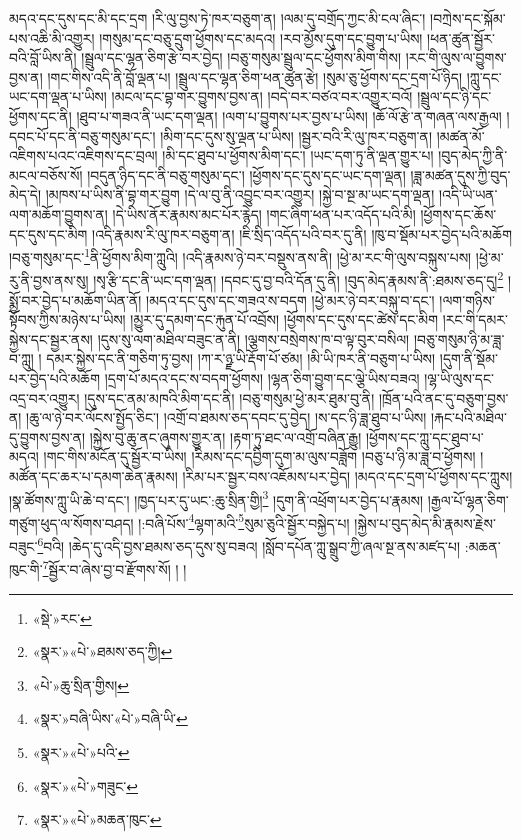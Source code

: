 མདའ་དང་དུས་དང་མི་དང་དྲག །རི་ལུ་བྱས་ཏེ་ཁར་བཅུག་ན། །ལམ་དུ་བགྲོད་ཀྱང་མི་ངལ་ཞིང་། །བཀྲེས་དང་སྐོམ་པས་འཆི་མི་འགྱུར། །གསུམ་དང་བཅུ་དྲུག་ཕྱོགས་དང་མདའ། །རབ་མྱོས་དུག་དང་བྱུག་པ་ཡིས། །ཕན་ཚུན་སྦྱོར་བའི་བློ་ཡིས་ནི། །སྦྲུལ་དང་ལྷན་ཅིག་རྩེ་བར་བྱེད། །བཅུ་གསུམ་སྦྲུལ་དང་ཕྱོགས་མིག་གིས། །རང་གི་ལུས་ལ་བྱུགས་བྱས་ན། །གང་གིས་འདི་ནི་བློ་ལྡན་པ། །སྦྲུལ་དང་ལྷན་ཅིག་ཕན་ཚུན་རྩེ། །སུམ་ཅུ་ཕྱོགས་དང་དྲག་པོ་ཉིད། །ཀླུ་དང་ཡང་དག་ལྡན་པ་ཡིས། །མངལ་དང་བྷ་གར་བྱུགས་བྱས་ན། །བདེ་བར་བཙའ་བར་འགྱུར་བའོ། །སྦྲུལ་དང་ཉི་དང་ཕྱོགས་དང་ནི། །ཐུབ་པ་གཟའ་ནི་ཡང་དག་ལྡན། །ལག་པ་བྱུགས་པར་བྱས་པ་ཡིས། །ཆོ་ལོ་རྩེ་ན་གཞན་ལས་རྒྱལ། །དབང་པོ་དང་ནི་བཅུ་གསུམ་དང་། །མིག་དང་དུས་སུ་ལྡན་པ་ཡིས། །སྦྱར་བའི་རི་ལུ་ཁར་བཅུག་ན། །མཚན་མོ་འཇིགས་པའང་འཇིགས་དང་བྲལ། །མི་དང་ཐུབ་པ་ཕྱོགས་མིག་དང་། །ཡང་དག་ཏུ་ནི་ལྡན་གྱུར་པ། །བུད་མེད་ཀྱི་ནི་མངལ་བཅོས་སོ། །བདུན་ཉིད་དང་ནི་བཅུ་གསུམ་དང་། །ཕྱོགས་དང་དུས་དང་ཡང་དག་ལྡན། །ཟླ་མཚན་དུས་ཀྱི་བུད་མེད་དེ། །མཁས་པ་ཡིས་ནི་བྷ་གར་བྱུག །དེ་ལ་བུ་ནི་འབྱུང་བར་འགྱུར། །སྐྱེ་བ་སྔ་མ་ཡང་དག་ལྡན། །འདི་ཡི་ཡན་ལག་མཆོག་བྱུགས་ན། །དེ་ཡིས་ནོར་རྣམས་མང་པོར་རྙེད། །གང་ཞིག་ཕན་པར་འདོད་པའི་མི། །ཕྱོགས་དང་ཆོས་དང་དུས་དང་མིག །འདི་རྣམས་རི་ལུ་ཁར་བཅུག་ན། །ཇི་སྲིད་འདོད་པའི་བར་དུ་ནི། །ཁུ་བ་སྡོམ་པར་བྱེད་པའི་མཆོག །བཅུ་གསུམ་དང་\footnote{«སྡེ་»རང་}ནི་ཕྱོགས་མིག་ཀླུའི། །འདི་རྣམས་ཉེ་བར་བསྡུས་ནས་ནི། །ཕྱེ་མ་རང་གི་ལུས་བསྐུས་པས། །ཕྱེ་མ་རུ་ནི་བྱས་ནས་སུ། །སྭ་རྩི་དང་ནི་ཡང་དག་ལྡན། །དབང་དུ་བྱ་བའི་དོན་དུ་ནི། །བུད་མེད་རྣམས་ནི་:ཐམས་ཅད་དུ།\footnote{«སྣར་»«པེ་»ཐམས་ཅད་ཀྱི།} །སྨྱོ་བར་བྱེད་པ་མཆོག་ཡིན་ནོ། །མདའ་དང་དུས་དང་གཟའ་ས་བདག །ཕྱེ་མར་ཉེ་བར་བསྐུ་བ་དང་། །ལག་གཉིས་སྟོབས་ཀྱིས་མཉེས་པ་ཡིས། །མྱུར་དུ་དམག་དང་རྐུན་པོ་འབྲོས། །ཕྱོགས་དང་དུས་དང་ཚེས་དང་མིག །རང་གི་དམར་སྐྱེས་དང་སྦྱར་ནས། །དུས་སུ་ལག་མཐིལ་བཟུང་ན་ནི། །ལྕགས་བསྲེགས་ཁ་བ་ལྟ་བུར་བསིལ། །བཅུ་གསུམ་ཉི་མ་ཟླ་བ་ཀླུ། །
དམར་སྐྱེས་དང་ནི་གཅིག་ཏུ་བྱས། །ཀ་ར་ཉྫ་ཡི་རྡོག་པོ་ཙམ། །མི་ཡི་ཁར་ནི་བཅུག་པ་ཡིས། །དུག་ནི་སྡོམ་པར་བྱེད་པའི་མཆོག །དྲག་པོ་མདའ་དང་ས་བདག་ཕྱོགས། །ལྷན་ཅིག་བྱུག་དང་ལྕེ་ཡིས་བཟའ། །ལྷ་ཡི་ལུས་དང་འདྲ་བར་འགྱུར། །དུས་དང་ནམ་མཁའི་མིག་དང་ནི། །བཅུ་གསུམ་ཕྱེ་མར་ཐུམ་བུ་ནི། །ཁྲོན་པའི་ནང་དུ་བཅུག་བྱས་ན། །ཆུ་ལ་ཉེ་བར་ལོངས་སྤྱོད་ཅིང་། །འགྲོ་བ་ཐམས་ཅད་དབང་དུ་བྱེད། །ས་དང་ཉི་ཟླ་ཐུབ་པ་ཡིས། །རྐང་པའི་མཐིལ་དུ་བྱུགས་བྱས་ན། །སྐྱེས་བུ་ཆུ་ནང་ཞུགས་གྱུར་ན། །རྟག་ཏུ་ཐང་ལ་འགྲོ་བཞིན་རྒྱུ། །ཕྱོགས་དང་ཀླུ་དང་ཐུབ་པ་མདའ། །གང་གིས་མངོན་དུ་སྦྱོར་བ་ཡིས། །རིམས་དང་དབྱིག་དུག་མ་ལུས་བཟློག །བཅུ་པ་ཉི་མ་ཟླ་བ་ཕྱོགས། །མཚོན་དང་ཆར་པ་དམག་ཆེན་རྣམས། །རིམ་པར་སྦྱར་བས་འཇོམས་པར་བྱེད། །མདའ་དང་དྲག་པོ་ཕྱོགས་དང་ཀླུས། །སྣ་ཚོགས་ཀླུ་ཡི་ཆེ་བ་དང་། །ཁྱད་པར་དུ་ཡང་:ཆུ་སྲིན་གྱི།\footnote{«པེ་»ཆུ་སྲིན་གྱིས།} །དུག་ནི་འཕྲོག་པར་བྱེད་པ་རྣམས། །རྒྱལ་པོ་ལྷན་ཅིག་གཙུག་ཕུད་ལ་སོགས་བཤད། །:བཞི་པོས་\footnote{«སྣར་»བཞི་ཡིས་«པེ་»བཞི་ཡི་}ལྷག་མའི་\footnote{«སྣར་»«པེ་»པའི་}སུམ་ཅུའི་སྦྱོར་བསྐྱེད་པ། །སྐྱེས་པ་བུད་མེད་མི་རྣམས་རྗེས་བཟུང་\footnote{«སྣར་»«པེ་»གཟུང་}བའི། །ཆེད་དུ་འདི་བྱས་ཐམས་ཅད་དུས་སུ་བཟའ། །སློབ་དཔོན་ཀླུ་སྒྲུབ་ཀྱི་ཞལ་སྔ་ནས་མཛད་པ། :མཆན་ཁུང་གི་\footnote{«སྣར་»«པེ་»མཆན་ཁུང་}སྦྱོར་བ་ཞེས་བྱ་བ་རྫོགས་སོ། ། །
